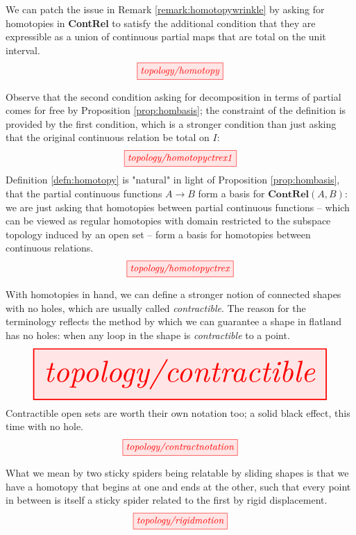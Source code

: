 \begin{myboxB}
\begin{defn}\label{defn:homotopy}
We can patch the issue in Remark \ref{remark:homotopywrinkle} by asking for homotopies in \textbf{ContRel} to satisfy the additional condition that they are expressible as a union of continuous partial maps that are total on the unit interval.
\[\tikzfig{topology/homotopy}\]
\end{defn}
\end{myboxB}

\begin{myboxR}
\begin{remark}
Observe that the second condition asking for decomposition in terms of partial comes for free by Proposition \ref{prop:hombasis}; the constraint of the definition is provided by the first condition, which is a stronger condition than just asking that the original continuous relation be total on $I$:
\[\tikzfig{topology/homotopyctrex1}\]
Definition \ref{defn:homotopy} is "natural" in light of Proposition \ref{prop:hombasis}, that the partial continuous functions $A \rightarrow B$ form a basis for $\mathbf{ContRel}(A,B)$: we are just asking that homotopies between partial continuous functions -- which can be viewed as regular homotopies with domain restricted to the subspace topology induced by an open set -- form a basis for homotopies between continuous relations.
\[\tikzfig{topology/homotopyctrex}\]
\end{remark}
\end{myboxR}

\begin{myboxB}
\begin{defn}[Contractibility]\label{defn:contractible}
With homotopies in hand, we can define a stronger notion of connected shapes with no holes, which are usually called \emph{contractible}. The reason for the terminology reflects the method by which we can guarantee a shape in flatland has no holes: when any loop in the shape is \emph{contractible} to a point.
\[\resizebox{\textwidth}{!}{\tikzfig{topology/contractible}}\]
Contractible open sets are worth their own notation too; a solid black effect, this time with no hole.
\[\tikzfig{topology/contractnotation}\]
\end{defn}
\end{myboxB}

\begin{myboxR}
\begin{defn}\label{defn:sliding}
What we mean by two sticky spiders being relatable by sliding shapes is that we have a homotopy that begins at one and ends at the other, such that every point in between is itself a sticky spider related to the first by rigid displacement.
\[\tikzfig{topology/rigidmotion}\]
\end{defn}
\end{myboxR}


